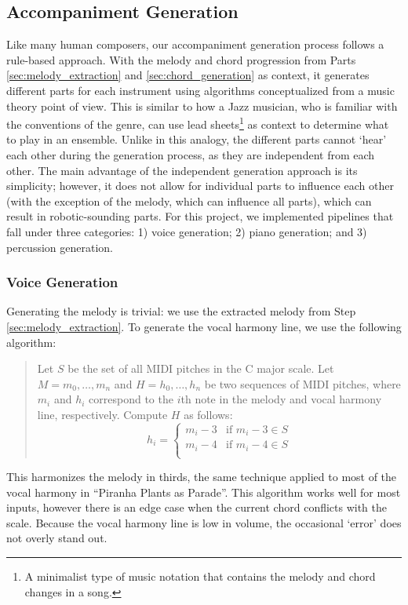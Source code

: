 \subsection{Accompaniment Generation}
\label{sec:accompaniment_generation}

Like many human composers, our accompaniment generation process follows a rule-based approach. With the melody and chord progression from Parts \ref{sec:melody_extraction} and \ref{sec:chord_generation} as context, it generates different parts for each instrument using algorithms conceptualized from a music theory point of view. This is similar to how a Jazz musician, who is familiar with the conventions of the genre, can use lead sheets\footnote{A minimalist type of music notation that contains the melody and chord changes in a song.} as context to determine what to play in an ensemble. Unlike in this analogy, the different parts cannot `hear' each other during the generation process, as they are independent from each other. The main advantage of the independent generation approach is its simplicity; however, it does not allow for individual parts to influence each other (with the exception of the melody, which can influence all parts), which can result in robotic-sounding parts. For this project, we implemented pipelines that fall under three categories: 1) voice generation; 2) piano generation; and 3) percussion generation.

\subsubsection{Voice Generation}

Generating the melody is trivial: we use the extracted melody from Step \ref{sec:melody_extraction}. To generate the vocal harmony line, we use the following algorithm:
\begin{quote}
    Let $S$ be the set of all MIDI pitches in the C major scale.
    Let $M = m_0, \ldots, m_n$ and $H = h_0, \ldots, h_n$ be two sequences of MIDI pitches, where $m_i$ and $h_i$ correspond to the $i$th note in the melody and vocal harmony line, respectively.
    Compute $H$ as follows:
    $$h_i = \begin{cases}
        m_i - 3 & \text{if }m_i - 3 \in S \\
        m_i - 4 & \text{if }m_i - 4 \in S \\
    \end{cases}$$
\end{quote}
This harmonizes the melody in thirds, the same technique applied to most of the vocal harmony in ``Piranha Plants as Parade''. This algorithm works well for most inputs, however there is an edge case when the current chord conflicts with the scale. Because the vocal harmony line is low in volume, the occasional `error' does not overly stand out.

